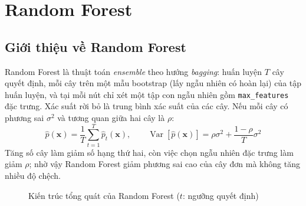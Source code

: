 \section{Random Forest}\label{sec:rf}

\subsection{Giới thiệu về Random Forest}
Random Forest \cite{breiman2001} là thuật toán \textit{ensemble} theo hướng \textit{bagging}: huấn luyện $T$ cây quyết định, mỗi cây trên một mẫu bootstrap (lấy ngẫu nhiên có hoàn lại) của tập huấn luyện, và tại mỗi nút chỉ xét một tập con ngẫu nhiên gồm \texttt{max\_features} đặc trưng. Xác suất rời bỏ là trung bình xác suất của các cây. Nếu mỗi cây có phương sai $\sigma^2$ và tương quan giữa hai cây là $\rho$:
\begin{equation}
    \hat{p}(\mathbf{x}) = \frac{1}{T} \sum_{t=1}^{T} \hat{p}_t(\mathbf{x}), \qquad
    \operatorname{Var}\left[\hat{p}(\mathbf{x})\right] = \rho \sigma^2 + \frac{1 - \rho}{T} \sigma^2
\end{equation}
Tăng số cây làm giảm số hạng thứ hai, còn việc chọn ngẫu nhiên đặc trưng làm giảm $\rho$; nhờ vậy Random Forest giảm phương sai cao của cây đơn mà không tăng nhiều độ chệch.

\begin{figure}[H]
\centering
{}
\caption{Kiến trúc tổng quát của Random Forest ($t$: ngưỡng quyết định)}
\end{figure}

